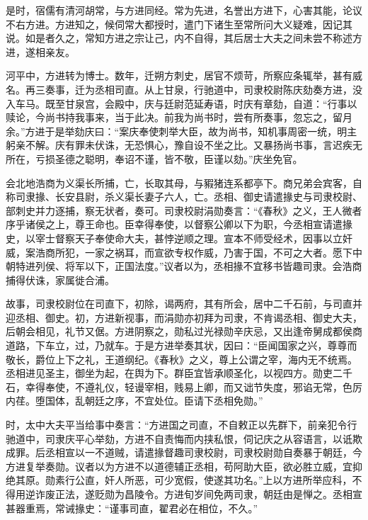 \documentclass[12pt,UTF8]{ctexbook}
\begin{document}
是时，宿儒有清河胡常，与方进同经。常为先进，名誉出方进下，心害其能，论议不右方进。方进知之，候伺常大都授时，遣门下诸生至常所问大义疑难，因记其说。如是者久之，常知方进之宗让己，内不自得，其后居士大夫之间未尝不称述方进，遂相亲友。



河平中，方进转为博士。数年，迁朔方刺史，居官不烦苛，所察应条辄举，甚有威名。再三奏事，迁为丞相司直。从上甘泉，行驰道中，司隶校尉陈庆劾奏方进，没入车马。既至甘泉宫，会殿中，庆与廷尉范延寿语，时庆有章劾，自道：“行事以赎论，今尚书持我事来，当于此决。前我为尚书时，尝有所奏事，忽忘之，留月余。”方进于是举劾庆曰：“案庆奉使刺举大臣，故为尚书，知机事周密一统，明主躬亲不解。庆有罪未伏诛，无恐惧心，豫自设不坐之比。又暴扬尚书事，言迟疾无所在，亏损圣德之聪明，奉诏不谨，皆不敬，臣谨以劾。”庆坐免官。



会北地浩商为义渠长所捕，亡，长取其母，与豭猪连系都亭下。商兄弟会宾客，自称司隶掾、长安县尉，杀义渠长妻子六人，亡。丞相、御史请遣掾史与司隶校尉、部刺史并力逐捕，察无状者，奏可。司隶校尉涓勋奏言：“《春秋》之义，王人微者序乎诸侯之上，尊王命也。臣幸得奉使，以督察公卿以下为职，今丞相宣请遣掾史，以宰士督察天子奉使命大夫，甚悖逆顺之理。宣本不师受经术，因事以立奸威，案浩商所犯，一家之祸耳，而宣欲专权作威，乃害于国，不可之大者。愿下中朝特进列侯、将军以下，正国法度。”议者以为，丞相掾不宜移书皆趣司隶。会浩商捕得伏诛，家属徙合浦。



故事，司隶校尉位在司直下，初除，谒两府，其有所会，居中二千石前，与司直并迎丞相、御史。初，方进新视事，而涓勋亦初拜为司隶，不肯谒丞相、御史大夫，后朝会相见，礼节又倨。方进阴察之，勋私过光禄勋辛庆忌，又出逢帝舅成都侯商道路，下车立，过，乃就车。于是方进举奏其状，因曰：“臣闻国家之兴，尊尊而敬长，爵位上下之礼，王道纲纪。《春秋》之义，尊上公谓之宰，海内无不统焉。丞相进见圣主，御坐为起，在舆为下。群臣宜皆承顺圣化，以视四方。勋吏二千石，幸得奉使，不遵礼仪，轻谩宰相，贱易上卿，而又诎节失度，邪谄无常，色厉内荏。堕国体，乱朝廷之序，不宜处位。臣请下丞相免勋。”



时，太中大夫平当给事中奏言：“方进国之司直，不自敕正以先群下，前亲犯令行驰道中，司隶庆平心举劾，方进不自责悔而内挟私恨，伺记庆之从容语言，以诋欺成罪。后丞相宣以一不道贼，请遣掾督趣司隶校尉，司隶校尉勋自奏暴于朝廷，今方进复举奏勋。议者以为方进不以道德辅正丞相，苟阿助大臣，欲必胜立威，宜抑绝其原。勋素行公直，奸人所恶，可少宽假，使遂其功名。”上以方进所举应科，不得用逆诈废正法，遂贬勋为昌陵令。方进旬岁间免两司隶，朝廷由是惮之。丞相宣甚器重焉，常诫掾史：“谨事司直，翟君必在相位，不久。”
\end{document}
